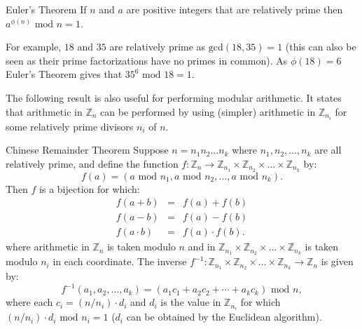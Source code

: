 \begin{theorem}{Euler's Theorem}
  If $n$ and $a$ are positive integers that are relatively prime then
  $a^{\phi(n)}\mbox{ mod }n = 1$.
\end{theorem}

For example, $18$ and $35$ are relatively prime as $\mbox{gcd}(18,35)=1$
(this can also be seen as their prime factorizations have no primes in common).
As $\phi(18)=6$ Euler's Theorem gives that $35^6\mbox{ mod }18=1$.

The following result is also useful for performing modular arithmetic.
It states that arithmetic in $\mathbb{Z}_n$ can be performed by using (simpler)
arithmetic in $\mathbb{Z}_{n_i}$ for some relatively prime divisors $n_i$ of $n$.

\begin{theorem}{Chinese Remainder Theorem}
  Suppose $n=n_1n_2\dots n_k$ where $n_1, n_2, \dots, n_k$ are all relatively prime,
  and define the function
  $f\colon\mathbb{Z}_n\to\mathbb{Z}_{n_1}\times\mathbb{Z}_{n_2}\times\dots\times\mathbb{Z}_{n_k}$
  by:
  \begin{displaymath}
    f(a) = \left( a\mbox{ mod }n_1, a\mbox{ mod }n_2, \dots, a\mbox{ mod }n_k \right).
  \end{displaymath}
  Then $f$ is a bijection for which:
  \begin{eqnarray*}
    f(a+b) &=& f(a)+f(b) \\
    f(a-b) &=& f(a)-f(b) \\
    f(a\cdot b) &=& f(a)\cdot f(b).
  \end{eqnarray*}
  where arithmetic in $\mathbb{Z}_n$ is taken modulo $n$ and in
  $\mathbb{Z}_{n_1}\times\mathbb{Z}_{n_2}\times\dots\times\mathbb{Z}_{n_k}$ is taken
  modulo $n_i$ in each coordinate.
  The inverse $f^{-1}\colon
  \mathbb{Z}_{n_1}\times\mathbb{Z}_{n_2}\times\dots\times\mathbb{Z}_{n_k}\to\mathbb{Z}_n$
  is given by:
  \begin{displaymath}
    f^{-1}\left( a_1, a_2, \dots, a_k \right)
    = \left( a_1c_1+a_2c_2+\cdots+a_kc_k \right)\mbox{ mod }n,
  \end{displaymath}
  where each $c_i=(n/n_i)\cdot d_i$
  and $d_i$ is the value in $\mathbb{Z}_{n_i}$ for which
  $(n/n_i)\cdot d_i\mbox{ mod }n_i=1$ ($d_i$ can be obtained by the Euclidean algorithm).
\end{theorem}

